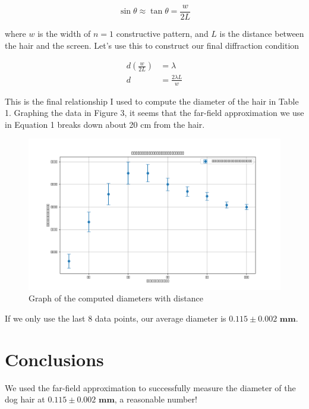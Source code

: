\documentclass[12pt,letterpaper]{article}
\begin{document}
\begin{equation}
    \sin\theta\approx\tan\theta=\frac{w}{2L}
\end{equation}

where $w$ is the width of $n=1$ constructive pattern, and $L$ is the distance between the hair and the screen. Let's use this to construct our final diffraction condition

\begin{align}
    d\left(\frac{w}{2L}\right) &= \lambda \\
    d&=\frac{2\lambda L}{w}
\end{align}

This is the final relationship I used to compute the diameter of the hair in Table 1. Graphing the data in Figure 3, it seems that the far-field approximation we use in Equation 1 breaks down about 20 cm from the hair.

\begin{figure}[h]
    \centering
    \includegraphics[width=7in]{images/beam_diameter.png}
    \caption{Graph of the computed diameters with distance}
    \label{fig:setup}
\end{figure}

 If we only use the last 8 data points, our average diameter is $\mathbf{0.115 \pm 0.002} \textbf{ mm}$.

\section{Conclusions}

We used the far-field approximation to successfully measure the diameter of the dog hair at $\mathbf{0.115 \pm 0.002} \textbf{ mm}$, a reasonable number!

% 
% 
\end{document}

